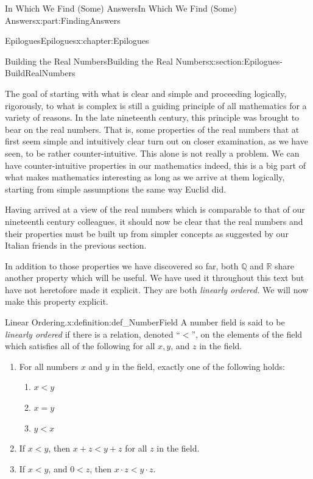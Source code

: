 \documentclass[oneside,10pt,]{book}
\numberwithin{equation}{section}
\newcommand{\RR}{\mathbb {R}}
\newcommand{\QQ}{\mathbb {Q}}
\newcommand{\lt}{<}
\begin{document}
\begin{partptx}{In Which We Find (Some) Answers}{}{In Which We Find (Some) Answers}{}{}{x:part:FindingAnswers}
\begin{chapterptx}{Epilogues}{}{Epilogues}{}{}{x:chapter:Epilogues}
\begin{sectionptx}{Building the Real Numbers}{}{Building the Real Numbers}{}{}{x:section:Epilogues-BuildRealNumbers}
\begin{introduction}{}
\par
The goal of starting with what is clear and simple and proceeding logically, rigorously, to what is complex is still a guiding principle of all mathematics for a variety of reasons. In the late nineteenth century, this principle was brought to bear on the real numbers. That is, some properties of the real numbers that at first seem simple and intuitively clear turn out on closer examination, as we have seen, to be rather counter-intuitive. This alone is not really a problem. We can have counter-intuitive properties in our mathematics \textemdash{} indeed, this is a big part of what makes mathematics interesting \textemdash{} as long as we arrive at them logically, starting from simple assumptions the same way Euclid did.%
\par
Having arrived at a view of the real numbers which is comparable to that of our nineteenth century colleagues, it should now be clear that the real numbers and their properties must be built up from simpler concepts as suggested by our Italian friends in the previous section.%
\par
In addition to those properties we have discovered so far, both \(\QQ\) and \(\RR\) share another property which will be useful. We have used it throughout this text but have not heretofore made it explicit. They are both \emph{linearly ordered.} We will now make this property explicit.%
\begin{definition}{Linear Ordering.}{x:definition:def_NumberField}%
%
A number field is said to be \emph{linearly ordered} if there is a relation, denoted ``\(\lt \)'', on the elements of the field which satisfies all of the following for all \(x, y\), and \(z\) in the field.%
\par
%
\begin{enumerate}
\item{}For all numbers \(x\) and \(y\) in the field, exactly one of the following holds:%
\par
%
\begin{enumerate}
\item{}\(\displaystyle x\lt y\)%
\item{}\(\displaystyle x=y\)%
\item{}\(\displaystyle y\lt x\)%
\end{enumerate}
%
\item{}If \(x\lt y\), then \(x+z\lt y+z\) for all \(z\) in the field.%
\item{}If \(x\lt y\), and \(0\lt z\), then \(x\cdot z \lt y\cdot z\).%

\end{enumerate}
\end{definition}
\end{introduction}
\end{sectionptx}
\end{chapterptx}
\end{partptx}
\end{document}
